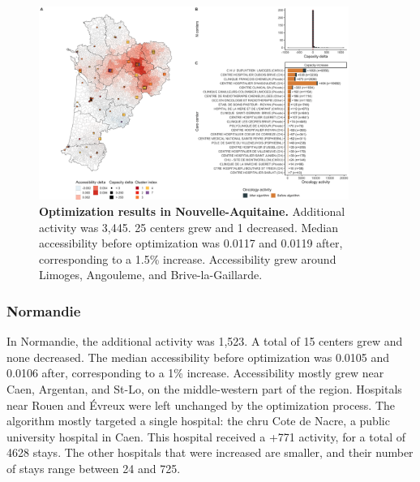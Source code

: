 \begin{figure}[h!]
    \includegraphics[width=0.9\textwidth]{images/camion/optim_region/optim_Nouvelle-Aquitaine.png}
    \centering
    \caption{ \textbf{Optimization results in Nouvelle-Aquitaine.} Additional
        activity was 3,445. 25 centers grew and 1 decreased. Median
        accessibility before optimization was 0.0117 and 0.0119 after,
        corresponding to a 1.5\% increase. Accessibility grew around Limoges,
        Angouleme, and Brive-la-Gaillarde. }
\end{figure}

\subsubsection{Normandie}

In Normandie, the additional activity was 1,523. A total of 15 centers grew and
none decreased. The median accessibility before optimization was 0.0105 and 0.0106 after,
corresponding to a 1\% increase. Accessibility mostly grew near Caen, Argentan, and
St-Lo, on the middle-western part of the region. Hospitals near Rouen and Évreux
were left unchanged by the optimization process. The algorithm mostly targeted
a single hospital: the \ac{chru} Cote de Nacre, a public university hospital in
Caen. This hospital received a +771 activity, for a total of 4628 stays. The
other hospitals that were increased are smaller, and their number of stays
range between 24 and 725.

